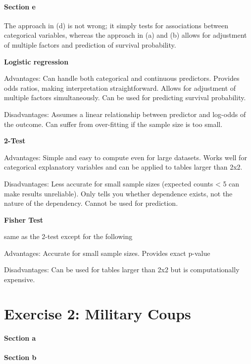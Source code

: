 \documentclass[
  11pt,
]{article}
\begin{document}
\paragraph{Section e}\label{section-e}

The approach in (d) is not wrong; it simply tests for associations
between categorical variables, whereas the approach in (a) and (b)
allows for adjustment of multiple factors and prediction of survival
probability.

\textbf{Logistic regression}

Advantages: Can handle both categorical and continuous predictors.
Provides odds ratios, making interpretation straightforward. Allows for
adjustment of multiple factors simultaneously. Can be used for
predicting survival probability.

Disadvantages: Assumes a linear relationship between predictor and
log-odds of the outcome. Can suffer from over-fitting if the sample size
is too small.

\textbf{2-Test}

Advantages: Simple and easy to compute even for large datasets. Works
well for categorical explanatory variables and can be applied to tables
larger than 2x2.

Disadvantages: Less accurate for small sample sizes (expected counts
\textless{} 5 can make results unreliable). Only tells you whether
dependence exists, not the nature of the dependency. Cannot be used for
prediction.

\textbf{Fisher Test}

same as the 2-test except for the following

Advantages: Accurate for small sample sizes. Provides exact p-value

Disadvantages: Can be used for tables larger than 2x2 but is
computationally expensive.

\section{Exercise 2: Military Coups}\label{exercise-2-military-coups}

\paragraph{Section a}\label{section-a-1}

\paragraph{Section b}\label{section-b-1}
\end{document}
